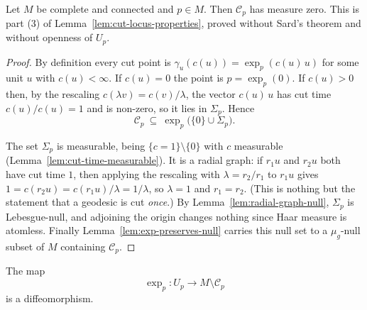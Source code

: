 \begin{lemma}
\label{lem:cut-locus-null}
\leanok



Let $M$ be complete and connected and $p\in M$. Then ${\mathcal C}_p$
has measure zero. This is part (3) of
Lemma~\ref{lem:cut-locus-properties}, proved without Sard's theorem and
without openness of $U_p$.
\end{lemma}

\begin{proof}
\sketch
{}
\leanok
By definition every cut point is $\gamma_u(c(u))=\exp_p(c(u)\,u)$ for
some unit $u$ with $c(u)<\infty$. If $c(u)=0$ the point is
$p=\exp_p(0)$. If $c(u)>0$ then, by the rescaling
$c(\lambda v)=c(v)/\lambda$, the vector $c(u)\,u$ has cut time
$c(u)/c(u)=1$ and is non-zero, so it lies in $\Sigma_p$. Hence
$${\mathcal C}_p\ \subseteq\ \exp_p\bigl(\{0\}\cup\Sigma_p\bigr).$$

The set $\Sigma_p$ is measurable, being $\{c=1\}\setminus\{0\}$ with
$c$ measurable (Lemma~\ref{lem:cut-time-measurable}). It is a radial
graph: if $r_1u$ and $r_2u$ both have cut time $1$, then applying the
rescaling with $\lambda=r_2/r_1$ to $r_1u$ gives
$1=c(r_2u)=c(r_1u)/\lambda=1/\lambda$, so $\lambda=1$ and $r_1=r_2$.
(This is nothing but the statement that a geodesic is cut \emph{once}.)
By Lemma~\ref{lem:radial-graph-null}, $\Sigma_p$ is Lebesgue-null, and
adjoining the origin changes nothing since Haar measure is atomless.
Finally Lemma~\ref{lem:exp-preserves-null} carries this null set to a
$\mu_g$-null subset of $M$ containing ${\mathcal C}_p$.
\end{proof}

\begin{proposition}
\label{prop:exponential-diffeomorphism-cut-locus}
\leanok


The map
$$\exp_p\colon U_p\to M\setminus {\mathcal C}_p$$
is a diffeomorphism. \end{proposition}

